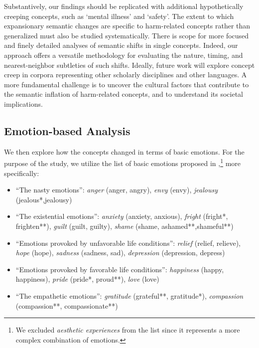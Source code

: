 \documentclass[output=paper]{langsci/langscibook}
\begin{document}
\begin{sloppypar}
Substantively, our findings should be replicated with additional hypothetically creeping concepts, such as `mental illness' and `safety'. The extent to which expansionary semantic changes are specific to harm-related concepts rather than generalized must also be studied systematically. There is scope for more focused and finely detailed analyses of semantic shifts in single concepts. Indeed, our approach offers a versatile methodology for evaluating the nature, timing, and nearest-neighbor subtleties of such shifts. Ideally, future work will explore concept creep in corpora representing other scholarly disciplines and other languages. A more fundamental challenge is to uncover the cultural factors that contribute to the semantic inflation of harm-related concepts, and to understand its societal implications.
\end{sloppypar}

\iffalse
\subsection{Emotion-based Analysis}
We then explore how the concepts changed in terms of basic emotions. For the purpose of the study, we utilize the list of basic emotions proposed in \citet{lazarus1994passion},\footnote{We excluded \emph{aesthetic experiences} from the list since it represents a more complex combination of emotions.} more specifically:
\begin{itemize}
    \item ``The nasty emotions'': \emph{anger} (anger, angry), \emph{envy} (envy), \emph{jealousy} (jealous*,jealousy)
    \item ``The existential emotions'': \emph{anxiety} (anxiety, anxious), \emph{fright} (fright*, frighten**), \emph{guilt} (guilt, guilty), \emph{shame} (shame, ashamed**,shameful**)
    \item ``Emotions provoked by unfavorable life conditions'': \emph{relief} (relief, relieve), \emph{hope} (hope), \emph{sadness} (sadness, sad), \emph{depression} (depression, depress)
    \item ``Emotions provoked by favorable life conditions'': \emph{happiness} (happy, happiness), \emph{pride} (pride*, proud**), \emph{love} (love)
    \item ``The empathetic emotions'': \emph{gratitude} (grateful**, gratitude*), \emph{compassion} (compassion**, compassionate**)
\end{itemize}
\end{document}
